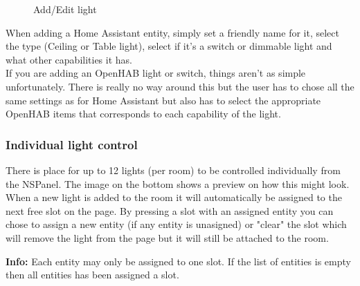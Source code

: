 \documentclass[10pt]{article}
\newcommand{\info}[1]{\begin{infoBox} \textbf{Info:} #1 \end{infoBox}}
\begin{document}
    \begin{figure}[H]
    \centering
    \qquad
    \caption{Add/Edit light}%
    \end{figure}
    
    When adding a Home Assistant entity, simply set a friendly name for it, select the type (Ceiling or Table light), select if it's a switch or dimmable light and what other capabilities it has.\\
    If you are adding an OpenHAB light or switch, things aren't as simple unfortunately. There is really no way around this but the user has to chose all the same settings as for Home Assistant but also has to select the appropriate OpenHAB items that corresponds to each capability of the light.

    \subsubsection{Individual light control}
    There is place for up to 12 lights (per room) to be controlled individually from the NSPanel. The image on the bottom shows a preview on how this might look. When a new light is added to the room it will automatically be assigned to the next free slot on the page. By pressing a slot with an assigned entity you can chose to assign a new entity (if any entity is unasigned) or "clear" the slot which will remove the light from the page but it will still be attached to the room.
    \info{Each entity may only be assigned to one slot. If the list of entities is empty then all entities has been assigned a slot.}
\end{document}

